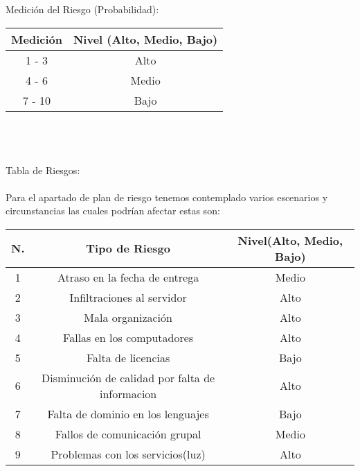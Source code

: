 \documentclass[40pt]{article}
\begin{document}
\maketitle
\textsf{\ \\
\\
Medición del Riesgo (Probabilidad): \\}

\begin{tabular}{| c | c |} \hline
Medición & Nivel (Alto, Medio, Bajo) \\ \hline
1 - 3 & Alto \\ \hline
4 - 6 & Medio \\ \hline
7 - 10& Bajo \\ \hline
\end{tabular}

\maketitle
\textsf{\ \\
\\
\\
Tabla de Riesgos:\\
\\
Para el apartado de plan de riesgo tenemos contemplado
varios escenarios y circunstancias las cuales podrían afectar
estas son: \\}

\begin{tabular}{| c | c | c |} \hline
N. & Tipo de Riesgo & Nivel(Alto, Medio, Bajo) \\ \hline
1 & Atraso en la fecha de entrega & Medio \\ \hline
2 & Infiltraciones al servidor & Alto \\ \hline
3 & Mala organización & Alto \\ \hline
4 & Fallas en los computadores & Alto \\ \hline
5 & Falta de licencias & Bajo \\ \hline
6 & Disminución de calidad por falta de informacion & Alto \\ \hline
7 & Falta de dominio en los lenguajes & Bajo \\ \hline
8 & Fallos de comunicación grupal & Medio \\ \hline
9 & Problemas con los servicios(luz) & Alto \\ \hline
\end{tabular}
\end{document}
